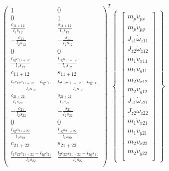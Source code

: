 \documentclass[12pt,a4paper]{article}
\begin{document}
\begin{equation}
\left(
\begin{array}{cc}
 1 & 0 \\
 0 & 1 \\
 \frac{c_{11+12} }{l_1 s_{12}} & \frac{s_{11+12}}{l_1 s_{12}} \\
 -\frac{c_{11}}{l_2 s_{12}} & -\frac{s_{11}}{l_2 s_{12} } \\
 0 & 0 \\
 \frac{l_{\text{1g}} c_{11+12}}{l_1 s_{12}} & \frac{l_{\text{1g}} s_{11+12} }{l_1 s_{12}} \\
 c_{11+12} & s_{11+12} \\
  \frac{l_2 c_{12} c_{11+12} - l_{\text{2g}} c_{11}}{l_2 s_{12}} &  \frac{l_2 c_{12} s_{11+12} - l_{\text{2g}} s_{11} }{l_2 s_{12}}  \\
 \frac{c_{21+22}}{l_1 s_{22}} & \frac{s_{21+22}}{l_1 s_{22}} \\
 -\frac{c_{21} }{l_2 s_{22}} & -\frac{s_{21}}{l_2 s_{22}} \\
 0 & 0 \\
 \frac{l_{\text{1g}} c_{21+22}}{l_1 s_{22}} & \frac{l_{\text{1g}} s_{21+22} }{l_1 s_{22}} \\
 c_{21+22} & s_{21+22} \\
  \frac{l_2 c_{22} c_{21+22} - l_{\text{2g}} c_{21}}{l_2 s_{22}} & \frac{l_2 c_{22} s_{21+22} - l_{\text{2g}} s_{21}}{l_2 s_{22}}  \\
\end{array}
\right)^T
\begin{Bmatrix}
	\begin{bmatrix}
	m_p \dot{v}_{px}  \\
	m_p \dot{v}_{py} \\
	J_{z1} \dot{\omega}_{z11} \\
	J_{z2} \dot{\omega}_{z12} \\
	m_1 \dot{v}_{x11} \\ 
	m_1 \dot{v}_{y11} \\
	m_2 \dot{v}_{x12} \\
	m_2 \dot{v}_{y12} \\
	J_{z1} \dot{\omega}_{z21} \\
	J_{z2} \dot{\omega}_{z22} \\
	m_1 \dot{v}_{x21} \\ 
	m_1 \dot{v}_{y21} \\
	m_2 \dot{v}_{x22} \\
	m_2 \dot{v}_{y22} \\
	\end{bmatrix}

\end{Bmatrix}
\end{equation}
\end{document}
